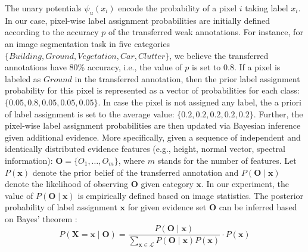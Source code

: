 The unary potentials $\psi_u\left(x_i\right)$ encode the probability of a pixel $i$ taking label $x_i$. In our case, pixel-wise label assignment probabilities are initially defined according to the accuracy  $p$ of the transferred weak annotations. For instance, for an image segmentation task in five categories $\{Building, Ground, Vegetation, Car, Clutter\}$, we believe the transferred annotations have 80\% accuracy, i.e., the value of $p$ is set to 0.8. If a pixel is labeled as $Ground$ in the transferred annotation, then the prior label assignment probability for this pixel is represented as a vector of probabilities for each class: $\{0.05, 0.8, 0.05, 0.05, 0.05\}$. In case the pixel is not assigned any label, the a priori of label assignment is set to the average value: $\{0.2, 0.2, 0.2, 0.2, 0.2\}$. %
Further, the pixel-wise label assignment probabilities are then updated via Bayesian inference given additional evidence. More specifically, given a sequence of independent and identically distributed evidence features (e.g., height, normal vector, spectral information): $\mathbf{O} = \{O_1, \dots, O_m\}$, where $m$ stands for the number of features. 
Let $P\left(\mathbf{x}\right)$ denote the prior belief of the transferred annotation and $P\left(\textbf{O}\mid \mathbf{x}\right)$ denote the likelihood of observing $\textbf{O}$ given category $\mathbf{x}$. In our experiment, the value of $P\left(\textbf{O}\mid \mathbf{x}\right)$ is empirically defined based on image statistics. The posterior probability of label assignment $\mathbf{x}$ for given evidence set $\mathbf{O}$ can be inferred based on Bayes' theorem \cite{gelman2013bayesian}:
\begin{equation}
\label{eq:2}
P\left(\mathbf{X}=\mathbf{x}\mid \mathbf {\mathbf{O}} \right)=\frac {P\left(\mathbf {O} \mid \mathbf{x}\right)}{\sum_{\mathbf{x}\in \mathcal{L}}{P\left(\mathbf {O} \mid \mathbf{\mathbf{x}}\right)P\left(\mathbf{x}\right)}}\cdot P\left(\mathbf{x}\right)
\end{equation}
